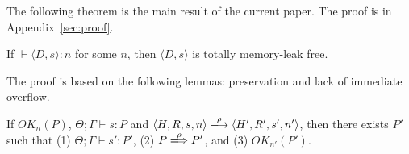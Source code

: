 The following theorem is the main result of the current paper.  The
proof is in Appendix~\ref{sec:proof}.

\begin{theorem}\label{thm1}
If $\vdash \langle D, s \rangle : n$ for some \(n\), then \(\langle D,
s \rangle\) is totally memory-leak free.
\end{theorem}


The proof is based on the following lemmas: preservation and lack of
immediate overflow.

\begin{lemma}[Preservation]
\label{lem:preservation}
If $OK_{n}(P)$, $\Theta; \Gamma \vdash s : P$ and $\langle H,R,s,n
\rangle \xlongrightarrow{\rho} \langle H',R',s', n' \rangle$, then
there exists $P'$ such that (1) $ \Theta; \Gamma \vdash s' : P'$, (2)
\(P \xLongrightarrow{\rho} P'\), and (3) \(OK_{n'}(P')\).
\end{lemma}


